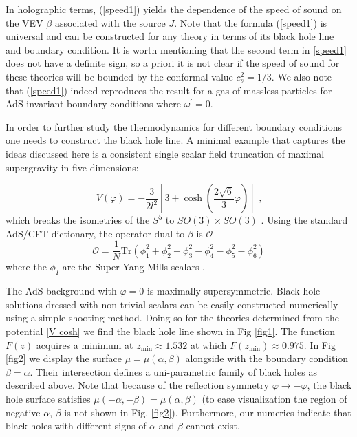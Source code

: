\documentclass[11pt,epsf,letterpaper]{article}%
\begin{document}
In holographic terms, (\ref{speed1}) yields the dependence of the speed of
sound on the VEV $\beta$ associated with the source $J$. Note that the formula
(\ref{speed1}) is universal and can be constructed for any theory in terms of
its black hole line and boundary condition. It is worth mentioning that the
second term in \eqref{speed1} does not have a definite sign, so a priori it is
not clear if the speed of sound for these theories will be bounded by the
conformal value $c_{s}^{2} = 1/3$. We also note that (\ref{speed1}) indeed
reproduces the result for a gas of massless particles for AdS invariant
boundary conditions where $\omega^{\prime}=0$.

In order to further study the thermodynamics for different boundary conditions
one needs to construct the black hole line. A minimal example that captures
the ideas discussed here is a consistent single scalar field truncation of
maximal supergravity in five dimensions:%

\begin{equation}
V\left(  \varphi\right)  =-\frac{3}{2l^{2}}\left[  3+\cosh\left(  \frac
{2\sqrt{6}}{3}\varphi\right)  \right]  \text{ ,} \label{V cosh}%
\end{equation}
which breaks the isometries of the $S^{5}$ to $SO(3)\times SO(3)$
\cite{Freedman:1999gk}. Using the standard AdS/CFT dictionary, the {operator
dual to $\beta$ is $\mathcal{O}$}%
\begin{equation}
\mathcal{O=}\frac{1}{N}\text{Tr}\left(  \phi_{1}^{2}+\phi_{2}^{2}+\phi_{3}%
^{2}-\phi_{4}^{2}-\phi_{5}^{2}-\phi_{6}^{2}\right)
\end{equation}
where the $\phi_{I}$ are the Super Yang-Mills scalars \cite{Witten:1998qj}.

The AdS background with $\varphi=0$ is maximally supersymmetric. Black hole
solutions dressed with non-trivial scalars can be easily constructed
numerically using a simple shooting method. Doing so for the theories
determined from the potential \eqref{V cosh} we find the black hole line shown
in Fig \ref{fig1}. The function $F(z)$ acquires a minimum at $z_{\mathrm{min}%
}\approx1.532$ at which $F(z_{\mathrm{min}})\approx0.975$. In Fig \ref{fig2}
we display the surface $\mu=\mu(\alpha,\beta)$ alongside with the boundary
condition $\beta=\alpha$. Their intersection defines a uni-parametric family
of black holes as described above. Note that because of the reflection
symmetry $\varphi\rightarrow-\varphi$, the black hole surface satisfies
$\mu(-\alpha,-\beta)=\mu(\alpha,\beta)$ (to ease visualization the region of
negative $\alpha$, $\beta$ is not shown in Fig. \ref{fig2}). Furthermore, our
numerics indicate that black holes with different signs of $\alpha$ and
$\beta$ cannot exist.
\end{document}
